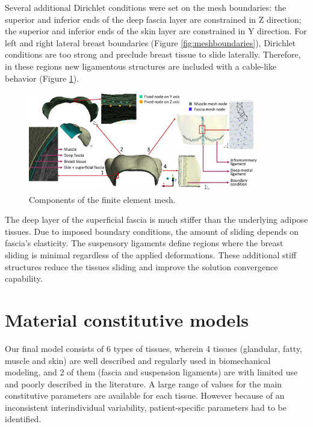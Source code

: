 Several additional Dirichlet conditions were set on the mesh boundaries: the superior and inferior ends of the deep fascia layer are constrained in Z direction; the superior and inferior ends of the skin layer are constrained in Y direction. For left and right lateral breast boundaries (Figure \ref{fig:meshboundaries}), Dirichlet conditions are too strong and preclude breast tissue to slide laterally. Therefore, in these regions new ligamentous structures are included with a cable-like behavior (Figure \ref{fig:mesh_components_BC}).



\begin{figure}[!h]
\centering
\includegraphics[width=0.9\textwidth,keepaspectratio]{figures/mesh_components.png} 
\caption{Components of the finite element mesh.}\label{fig:mesh_components_BC}
\end{figure}

 The deep layer of the superficial fascia is much stiffer than the underlying adipose tissues. Due to imposed boundary conditions, the amount of sliding depends on fascia's elasticity. The suspensory ligaments define regions where the breast sliding is minimal regardless of the applied deformations. These additional stiff structures reduce the tissues sliding and improve the solution convergence capability. 

\section{Material constitutive models}
\label{section:myConstitutivModels}

Our final model consists of 6 types of tissues, wherein 4 tissues (glandular, fatty, muscle and skin) are well described and regularly used in biomechanical modeling, and 2 of them (fascia and suspension ligaments) are with limited use and poorly described in the literature. A large range of values for the main constitutive parameters are available for each tissue. However because of an inconsistent interindividual variability, patient-specific parameters had to be identified.  


